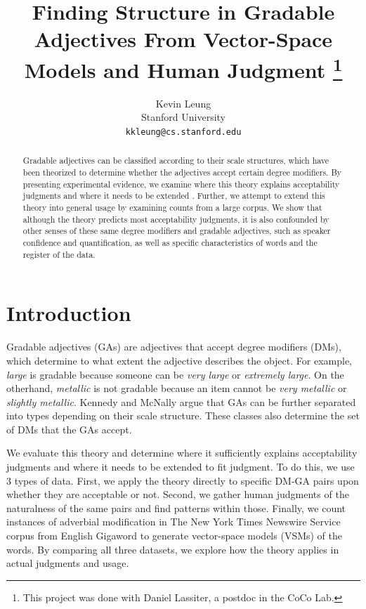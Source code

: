 \documentclass[11pt]{article}
\title{Finding Structure in Gradable Adjectives From Vector-Space Models and Human Judgment
\thanks{This project was done with Daniel Lassiter, a postdoc in the CoCo Lab.}}
\author{
  Kevin Leung \\
  Stanford University \\
  {\tt kkleung@cs.stanford.edu}}
\begin{document}
\maketitle

\begin{abstract}
Gradable adjectives can be classified according to their scale structures, which have been theorized to determine whether the adjectives accept certain degree modifiers. By presenting experimental evidence, we examine where this theory explains acceptability judgments and where it needs to be extended . Further, we attempt to extend this theory into general usage by examining counts from a large corpus. We show that although the theory predicts most acceptability judgments, it is also confounded by other senses of these same degree modifiers and gradable adjectives, such as speaker confidence and quantification, as well as specific characteristics of words and the register of the data.
\end{abstract}

\section{Introduction}

Gradable adjectives (GAs) are adjectives that accept degree modifiers (DMs), which determine to what extent the adjective describes the object. For example, \textit{large} is gradable because someone can be \textit{very large} or \textit{extremely large}. On the otherhand, \textit{metallic} is not gradable because an item cannot be \textit{very metallic} or \textit{slightly metallic}. Kennedy and McNally  argue that GAs can be further separated into types depending on their scale structure. These classes also determine the set of DMs that the GAs accept.

We evaluate this theory and determine where it sufficiently explains acceptability judgments and where it needs to be extended to fit judgment. To do this, we use 3 types of data. First, we apply the theory directly to specific DM-GA pairs upon whether they are acceptable or not. Second, we gather human judgments of the naturalness of the same pairs and find patterns within those. Finally, we count instances of adverbial modification in The New York Times Newswire Service corpus from English Gigaword to generate vector-space models (VSMs) of the words. By comparing all three datasets, we explore how the theory applies in actual judgments and usage.
\end{document}

